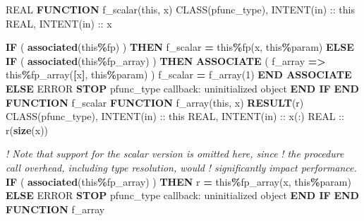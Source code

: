 \documentclass[
  paper=a4,
  ,captions=tableheading
]{scrartcl}
\newenvironment{Shaded}{\begin{snugshade}}{\end{snugshade}}
\newcommand{\CommentTok}[1]{\textcolor[rgb]{0.56,0.35,0.01}{\textit{#1}}}
\newcommand{\DataTypeTok}[1]{\textcolor[rgb]{0.13,0.29,0.53}{#1}}
\newcommand{\DecValTok}[1]{\textcolor[rgb]{0.00,0.00,0.81}{#1}}
\newcommand{\FunctionTok}[1]{\textcolor[rgb]{0.13,0.29,0.53}{\textbf{#1}}}
\newcommand{\KeywordTok}[1]{\textcolor[rgb]{0.13,0.29,0.53}{\textbf{#1}}}
\newcommand{\NormalTok}[1]{#1}
\newcommand{\OperatorTok}[1]{\textcolor[rgb]{0.81,0.36,0.00}{\textbf{#1}}}
\newcommand{\StringTok}[1]{\textcolor[rgb]{0.31,0.60,0.02}{#1}}
\begin{document}
\begin{Shaded}
\begin{Highlighting}[]
\DataTypeTok{REAL} \KeywordTok{FUNCTION}\NormalTok{ f\_scalar(this, x)}
   \DataTypeTok{CLASS(pfunc\_type)}\NormalTok{, }\DataTypeTok{INTENT(in)} \DataTypeTok{::}\NormalTok{ this}
   \DataTypeTok{REAL}\NormalTok{, }\DataTypeTok{INTENT(in)} \DataTypeTok{::}\NormalTok{ x}

   \KeywordTok{IF}\NormalTok{ ( }\FunctionTok{associated}\NormalTok{(this}\OperatorTok{\%}\NormalTok{fp) ) }\KeywordTok{THEN}
\NormalTok{      f\_scalar }\KeywordTok{=}\NormalTok{ this}\OperatorTok{\%}\NormalTok{fp(x, this}\OperatorTok{\%}\NormalTok{param)}
   \KeywordTok{ELSE} \KeywordTok{IF}\NormalTok{ ( }\FunctionTok{associated}\NormalTok{(this}\OperatorTok{\%}\NormalTok{fp\_array) ) }\KeywordTok{THEN}
      \KeywordTok{ASSOCIATE}\NormalTok{ ( f\_array }\KeywordTok{=}\OperatorTok{\textgreater{}}\NormalTok{ this}\OperatorTok{\%}\NormalTok{fp\_array(}\KeywordTok{[}\NormalTok{x}\KeywordTok{]}\NormalTok{, this}\OperatorTok{\%}\NormalTok{param) )}
\NormalTok{         f\_scalar }\KeywordTok{=}\NormalTok{ f\_array(}\DecValTok{1}\NormalTok{)}
      \KeywordTok{END ASSOCIATE}
   \KeywordTok{ELSE}
\NormalTok{      ERROR }\KeywordTok{STOP} \StringTok{\textquotesingle{}pfunc\_type callback: uninitialized object\textquotesingle{}}
   \KeywordTok{END IF}
\KeywordTok{END FUNCTION}\NormalTok{ f\_scalar}
\KeywordTok{FUNCTION}\NormalTok{ f\_array(this, x) }\KeywordTok{RESULT}\NormalTok{(r)}
   \DataTypeTok{CLASS(pfunc\_type)}\NormalTok{, }\DataTypeTok{INTENT(in)} \DataTypeTok{::}\NormalTok{ this}
   \DataTypeTok{REAL}\NormalTok{, }\DataTypeTok{INTENT(in)} \DataTypeTok{::}\NormalTok{ x(:)}
   \DataTypeTok{REAL} \DataTypeTok{::}\NormalTok{ r(}\FunctionTok{size}\NormalTok{(x))}

   \CommentTok{! Note that support for the scalar version is omitted here, since}
   \CommentTok{! the procedure call overhead, including type resolution, would}
   \CommentTok{! significantly impact performance.}
   \KeywordTok{IF}\NormalTok{ ( }\FunctionTok{associated}\NormalTok{(this}\OperatorTok{\%}\NormalTok{fp\_array) ) }\KeywordTok{THEN}
\NormalTok{      r }\KeywordTok{=}\NormalTok{ this}\OperatorTok{\%}\NormalTok{fp\_array(x, this}\OperatorTok{\%}\NormalTok{param)}
   \KeywordTok{ELSE}
\NormalTok{      ERROR }\KeywordTok{STOP} \StringTok{\textquotesingle{}pfunc\_type callback: uninitialized object\textquotesingle{}}
   \KeywordTok{END IF}
\KeywordTok{END FUNCTION}\NormalTok{ f\_array}
\end{Highlighting}
\end{Shaded}
\end{document}
